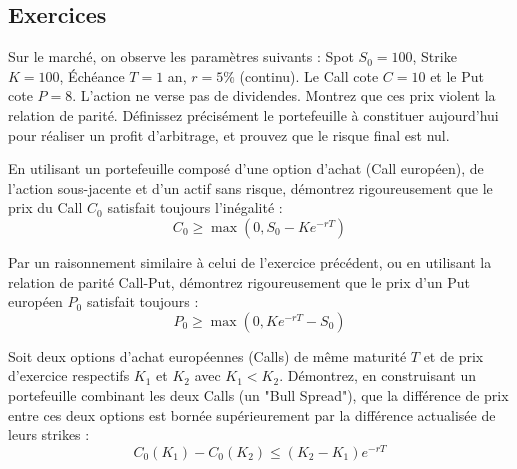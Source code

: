 \subsection{Exercices}

\begin{exercicebox}
Sur le marché, on observe les paramètres suivants : Spot $S_0 = 100$, Strike $K = 100$, Échéance $T = 1$ an, $r = 5\%$ (continu). Le Call cote $C = 10$ et le Put cote $P = 8$. L'action ne verse pas de dividendes.
Montrez que ces prix violent la relation de parité. Définissez précisément le portefeuille à constituer aujourd'hui pour réaliser un profit d'arbitrage, et prouvez que le risque final est nul.
\end{exercicebox}

\begin{exercicebox}
En utilisant un portefeuille composé d'une option d'achat (Call européen), de l'action sous-jacente et d'un actif sans risque, démontrez rigoureusement que le prix du Call $C_0$ satisfait toujours l'inégalité :
\begin{equation*}
    C_0 \geq \max(0, S_0 - K e^{-rT})
\end{equation*}
\end{exercicebox}

\begin{exercicebox}
Par un raisonnement similaire à celui de l'exercice précédent, ou en utilisant la relation de parité Call-Put, démontrez rigoureusement que le prix d'un Put européen $P_0$ satisfait toujours :
\begin{equation*}
    P_0 \geq \max(0, K e^{-rT} - S_0)
\end{equation*}
\end{exercicebox}

\begin{exercicebox}
Soit deux options d'achat européennes (Calls) de même maturité $T$ et de prix d'exercice respectifs $K_1$ et $K_2$ avec $K_1 < K_2$. Démontrez, en construisant un portefeuille combinant les deux Calls (un "Bull Spread"), que la différence de prix entre ces deux options est bornée supérieurement par la différence actualisée de leurs strikes :
\begin{equation*}
    C_0(K_1) - C_0(K_2) \leq (K_2 - K_1)e^{-rT}
\end{equation*}
\end{exercicebox}
